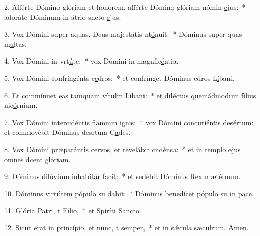 2. Afférte Dómino glóriam et honórem, afférte Dómino glóriam nómin \uline{e}jus:~* adoráte Dóminum in átrio sncto \uline{e}jus.\par 
3. Vox Dómini super aquas, Deus majestátis nt\uline{ó}nuit:~* Dóminus super quas m\uline{u}ltas.\par 
4. Vox Dómini in vrt\uline{ú}te:~* vox Dómini in magnfic\uline{é}ntia.\par 
5. Vox Dómini confringénts c\uline{e}dros:~* et confrínget Dóminus cdros L\uline{í}bani.\par 
6. Et commínuet eas tamquam vítulm L\uline{í}bani:~* et diléctus quemádmodum fílius nic\uline{ó}rnium.\par 
7. Vox Dómini intercidéntis flammm \uline{i}gnis:~* vox Dómini concutiéntis desértum: et commovébit Dóminus desrtum C\uline{a}des.\par 
8. Vox Dómini præparántis cervos, et revelábit cnd\uline{é}nsa:~* et in templo ejus omnes dcent gl\uline{ó}riam.\par 
9. Dóminus dilúvium inhabitár f\uline{a}cit:~* et sedébit Dóminus Rex n æt\uline{é}rnum.\par 
10. Dóminus virtútem pópulo su d\uline{a}bit:~* Dóminus benedícet pópulo su in p\uline{a}ce.\par 
11. Glória Patri, t F\uline{í}lio,~* et Spiríti S\uline{a}ncto.\par 
12. Sicut erat in princípio, et nunc, t s\uline{e}mper,~* et in sǽcula sæculrum. \uline{A}men.\par 
